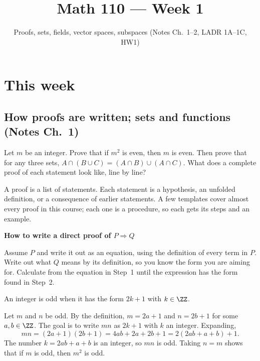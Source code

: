 \documentclass[10pt]{scrartcl}
\title{Math 110 --- Week 1}
\subtitle{Proofs, sets, fields, vector spaces, subspaces (Notes Ch.~1--2, LADR 1A--1C, HW1)}
\author{}\date{}\ihead{}
\newenvironment{methodbox}[1]{\begin{mdframed}[style=methodstyle]\textbf{\color{NavyBlue}#1}\par\vspace{2pt}}{\end{mdframed}}
\begin{document}
\maketitle

\section{This week}

\subsection{How proofs are written; sets and functions (Notes Ch.~1)}

\begin{qbox}
  Let $m$ be an integer. Prove that if $m^2$ is even, then $m$ is even. Then prove that for any three sets, $A\cap(B\cup C)=(A\cap B)\cup(A\cap C)$. What does a complete proof of each statement look like, line by line?
\end{qbox}

A proof is a list of statements. Each statement is a hypothesis, an unfolded definition, or a consequence of earlier statements. A few templates cover almost every proof in this course; each one is a procedure, so each gets its steps and an example.

\begin{methodbox}{How to write a direct proof of $P\Rightarrow Q$}
  \begin{steps}
    \ii Assume $P$ and write it out as an equation, using the definition of every term in $P$.
    \ii Write out what $Q$ means by its definition, so you know the form you are aiming for.
    \ii Calculate from the equation in Step~1 until the expression has the form found in Step~2.
  \end{steps}
\end{methodbox}

\begin{example*}
  An integer is odd when it has the form $2k+1$ with $k\in\ZZ$.
  \begin{steps}
    \ii Let $m$ and $n$ be odd. By the definition, $m=2a+1$ and $n=2b+1$ for some $a,b\in\ZZ$.
    \ii The goal is to write $mn$ as $2k+1$ with $k$ an integer.
    \ii Expanding,
    \[
      mn=(2a+1)(2b+1)=4ab+2a+2b+1=2(2ab+a+b)+1.
    \]
    The number $k=2ab+a+b$ is an integer, so $mn$ is odd. Taking $n=m$ shows that if $m$ is odd, then $m^2$ is odd.
  \end{steps}
\end{example*}
\end{document}
